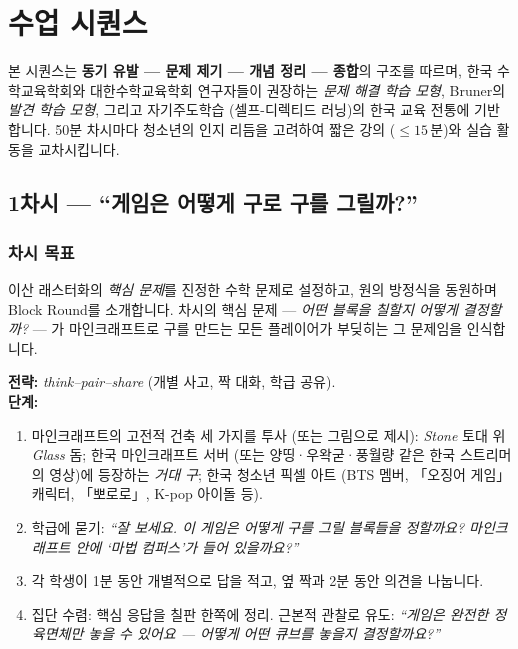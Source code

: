\documentclass[12pt,a4paper]{scrartcl}
\newcommand{\acc}[1]{\textcolor{accent}{\textbf{#1}}}
\newcommand{\tempo}[1]{\textnormal{\footnotesize\color{bg!90!white}\textsf{#1}}}
\begin{document}
\section{수업 시퀀스}\label{sec:sequencia}

본 시퀀스는 \acc{동기 유발 --- 문제 제기 --- 개념 정리 --- 종합}의 구조를 따르며, 한국 수학교육학회와 대한수학교육학회 연구자들이 권장하는 \emph{문제 해결 학습 모형}, Bruner의 \emph{발견 학습 모형}, 그리고 자기주도학습 (셀프-디렉티드 러닝)의 한국 교육 전통에 기반합니다. 50분 차시마다 청소년의 인지 리듬을 고려하여 짧은 강의 ($\leq 15$\,분)와 실습 활동을 교차시킵니다.

\subsection{1차시 --- \enquote{게임은 어떻게 구로 구를 그릴까?}}\label{aula1}

\subsubsection*{차시 목표}
이산 래스터화의 \emph{핵심 문제}를 진정한 수학 문제로 설정하고, 원의 방정식을 동원하며 Block Round를 소개합니다. 차시의 핵심 문제 --- \emph{어떤 블록을 칠할지 어떻게 결정할까?} --- 가 마인크래프트로 구를 만드는 모든 플레이어가 부딪히는 그 문제임을 인식합니다.

\begin{hwaldong}[1.1 --- 동기 유발 \quad\tempo{10분}]
\textbf{전략:} \emph{think--pair--share} (개별 사고, 짝 대화, 학급 공유). \\[0.4em]
\textbf{단계:}
\begin{enumerate}[leftmargin=1.5em,itemsep=0.2em,topsep=0.3em,nosep]
  \item 마인크래프트의 고전적 건축 세 가지를 투사 (또는 그림으로 제시): \emph{Stone} 토대 위 \emph{Glass} 돔; 한국 마인크래프트 서버 (또는 양띵·우왁굳·풍월량 같은 한국 스트리머의 영상)에 등장하는 \emph{거대 구}; 한국 청소년 픽셀 아트 (BTS 멤버, 「오징어 게임」 캐릭터, 「뽀로로」, K-pop 아이돌 등).
  \item 학급에 묻기: \emph{\enquote{잘 보세요. 이 게임은 어떻게 구를 그릴 블록들을 정할까요? 마인크래프트 안에 \enquote{마법 컴퍼스}가 들어 있을까요?}}
  \item 각 학생이 1분 동안 개별적으로 답을 적고, 옆 짝과 2분 동안 의견을 나눕니다.
  \item 집단 수렴: 핵심 응답을 칠판 한쪽에 정리. 근본적 관찰로 유도: \emph{\enquote{게임은 완전한 정육면체만 놓을 수 있어요 --- 어떻게 어떤 큐브를 놓을지 결정할까요?}}
\end{enumerate}
\end{hwaldong}
\end{document}
